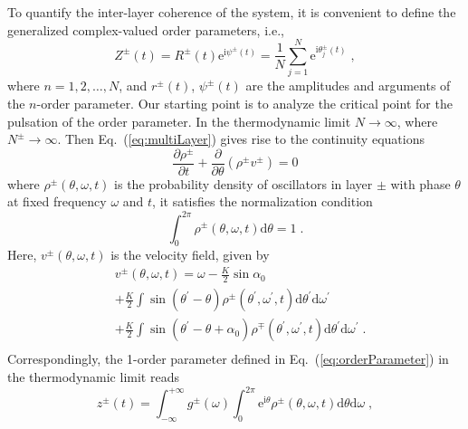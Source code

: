 \documentclass{article}
\begin{document}
To quantify the inter-layer coherence of the system, it is convenient to define the generalized complex-valued
order parameters, i.e.,
\begin{equation}
    \label{eq:orderParameter}
    Z^{\pm}\left( t \right) =R^{\pm}\left( t \right) \text{e}^{\text{i}\psi^{\pm}\left( t \right)}=\frac{1}{N}\sum_{j=1}^N{\text{e}^{\text{i}\theta _{j}^{\pm}\left( t \right)}}\;,
\end{equation}
where $n=1,2,\dots, N$, and $r^{\pm}\left( t \right)$, $\psi ^{\pm}\left( t \right)$ are the amplitudes and arguments of the $n$-order parameter.
Our starting point is to analyze the critical point for the pulsation of the order parameter.
In the thermodynamic limit $N\rightarrow \infty$, where $N^{\pm}\rightarrow \infty$. Then
Eq.~(\ref{eq:multiLayer}) gives rise to the continuity equations
\begin{equation}
    \label{eq:continuity}
    \frac{\partial \rho ^{\pm}}{\partial t}+\frac{\partial}{\partial \theta}\left( \rho ^{\pm}v^{\pm} \right) =0
\end{equation}
where $\rho ^{\pm}\left( \theta ,\omega ,t \right)$ is the probability density of oscillators in layer $\pm$ with phase $\theta$ at fixed frequency $\omega$ and $t$, it satisfies the normalization condition
\begin{equation}
    \label{eq:normalization}
    \int_{0}^{2\pi}{\rho ^{\pm}\left( \theta ,\omega ,t \right) \text{d}\theta} =1\;.
\end{equation}
Here, $v^{\pm}\left( \theta ,\omega ,t \right)$ is the velocity field, given by
\begin{equation}
    \begin{aligned}
        &v^{\pm}\left( \theta ,\omega ,t \right) =\omega -\frac{K}{2}\sin \alpha _0\\
        &+\frac{K}{2}\int{\sin \left( \theta ^{\prime}-\theta \right) \rho ^{\pm}\left( \theta ^{\prime},\omega ^{\prime},t \right) \text{d}\theta ^{\prime}\text{d}\omega ^{\prime}}\\
        &+\frac{K}{2}\int{\sin \left( \theta ^{\prime}-\theta +\alpha _0 \right) \rho ^{\mp}\left( \theta ^{\prime},\omega ^{\prime},t \right) \text{d}\theta ^{\prime}\text{d}\omega ^{\prime}}\;.\\
    \end{aligned}
\end{equation}
Correspondingly, the 1-order parameter defined in Eq.~(\ref{eq:orderParameter}) in the thermodynamic limit reads
\begin{equation}
    \label{eq:continuityZ}
    z^{\pm}\left( t \right) =\int_{-\infty}^{+\infty}{g^{\pm}(\omega)\int_0^{2\pi}{\text{e}^{\text{i}\theta}\rho ^{\pm}\left( \theta ,\omega ,t \right) \text{d}\theta \text{d}\omega}}\;,
\end{equation}
\end{document}
